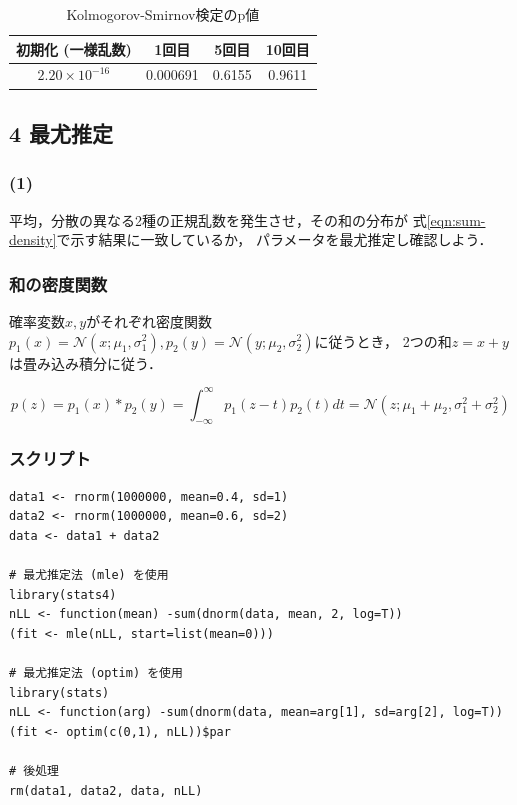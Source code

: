 \documentclass{jsarticle}
\begin{document}
\begin{table}[b]
	\centering
	\caption{Kolmogorov-Smirnov検定のp値}
	\label{tbl:ks.test}
	\begin{tabular}{c|c|c|c} \hline
		初期化 (一様乱数) & 1回目 & 5回目 & 10回目 \\ \hline
		$2.20\!\times\!10^{-16}$ & 0.000691 & 0.6155 & 0.9611 \\ \hline
	\end{tabular}
\end{table}

\subsection*{4 最尤推定}
\subsubsection*{(1)}
平均，分散の異なる2種の正規乱数を発生させ，その和の分布が
式\ref{eqn:sum-density}で示す結果に一致しているか，
パラメータを最尤推定し確認しよう．

\subsubsection*{和の密度関数}
確率変数$x,y$がそれぞれ密度関数$p_1(x)=\mathcal{N}(x;\mu_1, \sigma_1^2),
p_2(y)=\mathcal{N}(y;\mu_2,\sigma_2^2)$に従うとき，
2つの和$z=x+y$は畳み込み積分に従う．

\begin{equation}
	p(z) = p_1(x) \ast p_2(y) = \int_{-\infty}^{\infty} p_1(z-t)p_2(t) dt
	= \mathcal{N}(z; \mu_1+\mu_2, \sigma_1^2+\sigma_2^2)
	\label{eqn:sum-density}
\end{equation}

\subsubsection*{スクリプト}
\begin{lstlisting}[basicstyle=\ttfamily\footnotesize, frame=single]
data1 <- rnorm(1000000, mean=0.4, sd=1)
data2 <- rnorm(1000000, mean=0.6, sd=2)
data <- data1 + data2

# 最尤推定法 (mle) を使用
library(stats4)
nLL <- function(mean) -sum(dnorm(data, mean, 2, log=T))
(fit <- mle(nLL, start=list(mean=0)))

# 最尤推定法 (optim) を使用
library(stats)
nLL <- function(arg) -sum(dnorm(data, mean=arg[1], sd=arg[2], log=T))
(fit <- optim(c(0,1), nLL))$par

# 後処理
rm(data1, data2, data, nLL)
\end{lstlisting}
\end{document}
